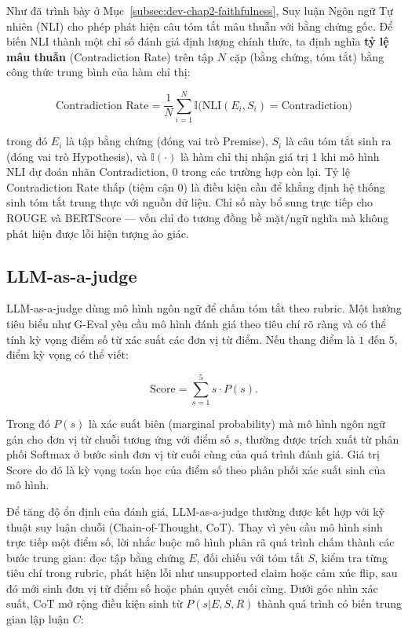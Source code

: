 Như đã trình bày ở Mục~\ref{subsec:dev-chap2-faithfulness}, Suy luận Ngôn ngữ Tự nhiên (NLI) cho phép phát hiện câu tóm tắt mâu thuẫn với bằng chứng gốc. Để biến NLI thành một chỉ số đánh giá định lượng chính thức, ta định nghĩa \textbf{tỷ lệ mâu thuẫn} (Contradiction Rate) trên tập $N$ cặp (bằng chứng, tóm tắt) bằng công thức trung bình của hàm chỉ thị:

\begin{equation}
\text{Contradiction Rate} = \frac{1}{N} \sum_{i=1}^{N} \mathbb{I}\bigl(\text{NLI}(E_i, S_i) = \text{Contradiction}\bigr)
\label{eq:dev-chap2-nli-contradiction-rate}
\end{equation}

trong đó $E_i$ là tập bằng chứng (đóng vai trò Premise), $S_i$ là câu tóm tắt sinh ra (đóng vai trò Hypothesis), và $\mathbb{I}(\cdot)$ là hàm chỉ thị nhận giá trị 1 khi mô hình NLI dự đoán nhãn Contradiction, 0 trong các trường hợp còn lại. Tỷ lệ Contradiction Rate thấp (tiệm cận 0) là điều kiện cần để khẳng định hệ thống sinh tóm tắt trung thực với nguồn dữ liệu. Chỉ số này bổ sung trực tiếp cho ROUGE và BERTScore --- vốn chỉ đo tương đồng bề mặt/ngữ nghĩa mà không phát hiện được lỗi hiện tượng ảo giác.

\subsection{LLM-as-a-judge}
\label{subsec:dev-chap2-llm-judge}

LLM-as-a-judge dùng mô hình ngôn ngữ để chấm tóm tắt theo rubric. Một hướng tiêu biểu như G-Eval yêu cầu mô hình đánh giá theo tiêu chí rõ ràng và có thể tính kỳ vọng điểm số từ xác suất các đơn vị từ điểm. Nếu thang điểm là $1$ đến $5$, điểm kỳ vọng có thể viết:

\begin{equation}
\text{Score}=\sum_{s=1}^{5}s\cdot P(s).
\label{eq:chap2-geval-score}
\end{equation}

Trong đó $P(s)$ là xác suất biên (marginal probability) mà mô hình ngôn ngữ gán cho đơn vị từ chuỗi tương ứng với điểm số $s$, thường được trích xuất từ phân phối Softmax ở bước sinh đơn vị từ cuối cùng của quá trình đánh giá. Giá trị $\text{Score}$ do đó là kỳ vọng toán học của điểm số theo phân phối xác suất sinh của mô hình.

Để tăng độ ổn định của đánh giá, LLM-as-a-judge thường được kết hợp với kỹ thuật suy luận chuỗi (Chain-of-Thought, CoT). Thay vì yêu cầu mô hình sinh trực tiếp một điểm số, lời nhắc buộc mô hình phân rã quá trình chấm thành các bước trung gian: đọc tập bằng chứng $E$, đối chiếu với tóm tắt $S$, kiểm tra từng tiêu chí trong rubric, phát hiện lỗi như unsupported claim hoặc cảm xúc flip, sau đó mới sinh đơn vị từ điểm số hoặc phán quyết cuối cùng. Dưới góc nhìn xác suất, CoT mở rộng điều kiện sinh từ $P(s|E,S,R)$ thành quá trình có biến trung gian lập luận $C$:


